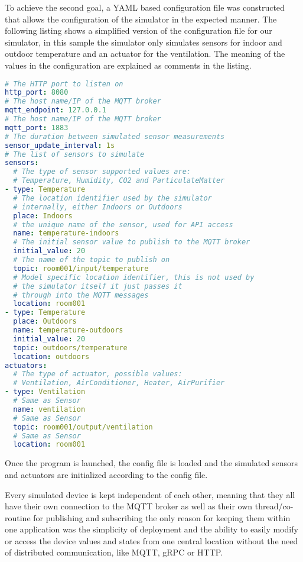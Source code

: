 To achieve the second goal, a YAML based configuration file was
constructed that allows the configuration of the simulator in the
expected manner.
The following listing shows a simplified version of the
configuration file for our simulator, in this sample the simulator only
simulates sensors for indoor and outdoor temperature and an actuator for
the ventilation.
The meaning of the values in the configuration are
explained as comments in the listing.

\begin{lstlisting}[language=yaml]
# The HTTP port to listen on
http_port: 8080
# The host name/IP of the MQTT broker
mqtt_endpoint: 127.0.0.1
# The host name/IP of the MQTT broker
mqtt_port: 1883
# The duration between simulated sensor measurements
sensor_update_interval: 1s
# The list of sensors to simulate
sensors:
  # The type of sensor supported values are:
  # Temperature, Humidity, CO2 and ParticulateMatter
- type: Temperature
  # The location identifier used by the simulator
  # internally, either Indoors or Outdoors
  place: Indoors
  # the unique name of the sensor, used for API access
  name: temperature-indoors
  # The initial sensor value to publish to the MQTT broker
  initial_value: 20
  # The name of the topic to publish on
  topic: room001/input/temperature
  # Model specific location identifier, this is not used by
  # the simulator itself it just passes it
  # through into the MQTT messages
  location: room001
- type: Temperature
  place: Outdoors
  name: temperature-outdoors
  initial_value: 20
  topic: outdoors/temperature
  location: outdoors
actuators:
  # The type of actuator, possible values:
  # Ventilation, AirConditioner, Heater, AirPurifier
- type: Ventilation
  # Same as Sensor
  name: ventilation
  # Same as Sensor
  topic: room001/output/ventilation
  # Same as Sensor
  location: room001
\end{lstlisting}

Once the program is launched, the config file is loaded and the
simulated sensors and actuators are initialized according to the config
file.

Every simulated device is kept independent of each other, meaning that
they all have their own connection to the MQTT broker as well as their
own thread/co-routine for publishing and subscribing the only reason for
keeping them within one application was the simplicity of deployment and
the ability to easily modify or access the device values and states from
one central location without the need of distributed communication, like
MQTT, gRPC or HTTP.

